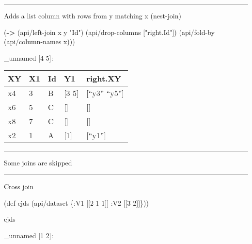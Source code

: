 \documentclass[]{article}
\newenvironment{Shaded}{\begin{snugshade}}{\end{snugshade}}
\newcommand{\AttributeTok}[1]{\textcolor[rgb]{0.77,0.63,0.00}{#1}}
\newcommand{\BuiltInTok}[1]{#1}
\newcommand{\DecValTok}[1]{\textcolor[rgb]{0.00,0.00,0.81}{#1}}
\newcommand{\FunctionTok}[1]{\textcolor[rgb]{0.00,0.00,0.00}{#1}}
\newcommand{\KeywordTok}[1]{\textcolor[rgb]{0.13,0.29,0.53}{\textbf{#1}}}
\newcommand{\NormalTok}[1]{#1}
\newcommand{\StringTok}[1]{\textcolor[rgb]{0.31,0.60,0.02}{#1}}
\begin{document}
\begin{center}\rule{0.5\linewidth}{0.5pt}\end{center}

Adds a list column with rows from y matching x (nest-join)

\begin{Shaded}
\begin{Highlighting}[]
\NormalTok{(}\KeywordTok{->}\NormalTok{ (api/left-join x y }\StringTok{"Id"}\NormalTok{)}
\NormalTok{    (api/drop-columns [}\StringTok{"right.Id"}\NormalTok{])}
\NormalTok{    (api/fold-by (api/column-names x)))}
\end{Highlighting}
\end{Shaded}

\_unnamed {[}4 5{]}:

\begin{longtable}[]{@{}lllll@{}}
\toprule
XY & X1 & Id & Y1 & right.XY\tabularnewline
\midrule
\endhead
x4 & 3 & B & {[}3 5{]} & {[}``y3'' ``y5''{]}\tabularnewline
x6 & 5 & C & {[}{]} & {[}{]}\tabularnewline
x8 & 7 & C & {[}{]} & {[}{]}\tabularnewline
x2 & 1 & A & {[}1{]} & {[}``y1''{]}\tabularnewline
\bottomrule
\end{longtable}

\begin{center}\rule{0.5\linewidth}{0.5pt}\end{center}

Some joins are skipped

\begin{center}\rule{0.5\linewidth}{0.5pt}\end{center}

Cross join

\begin{Shaded}
\begin{Highlighting}[]
\NormalTok{(}\BuiltInTok{def}\FunctionTok{ cjds }\NormalTok{(api/dataset \{}\AttributeTok{:V1}\NormalTok{ [[}\DecValTok{2} \DecValTok{1} \DecValTok{1}\NormalTok{]]}
                        \AttributeTok{:V2}\NormalTok{ [[}\DecValTok{3} \DecValTok{2}\NormalTok{]]\}))}
\end{Highlighting}
\end{Shaded}

\begin{Shaded}
\begin{Highlighting}[]
\NormalTok{cjds}
\end{Highlighting}
\end{Shaded}

\_unnamed {[}1 2{]}:
\end{document}
